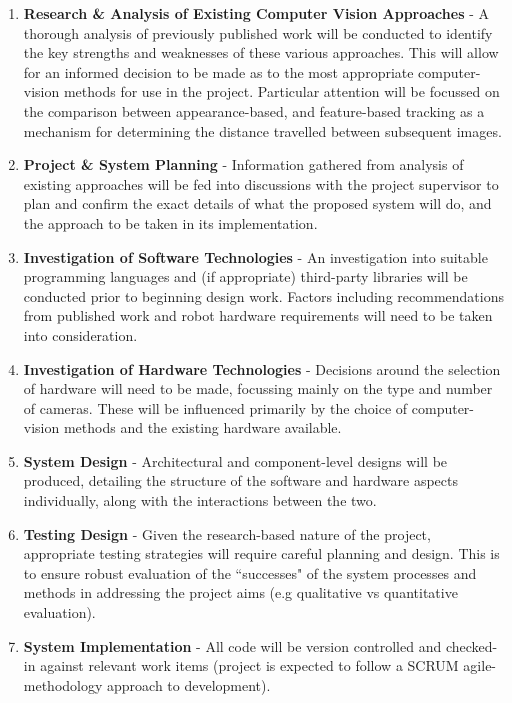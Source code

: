 \documentclass[10pt,fleqn,twoside]{article}
\begin{document}
\begin{enumerate}
	\item \textbf{Research \& Analysis of Existing Computer Vision Approaches} -  A thorough analysis of previously published work will be conducted to identify the key strengths and weaknesses of these various approaches. This will allow for an informed decision to be made as to the most appropriate computer-vision methods for use in the project. Particular attention will be focussed on the comparison between appearance-based, and feature-based tracking as a mechanism for determining the distance travelled between subsequent images. 
	
	\item \textbf{Project \& System Planning} - Information gathered from analysis of existing approaches will be fed into discussions with the project supervisor to plan and confirm the exact details of what the proposed system will do, and the approach to be taken in its implementation.

	\item \textbf{Investigation of Software Technologies} - An investigation into suitable programming languages and (if appropriate) third-party libraries will be conducted prior to beginning design work. Factors including recommendations from published work and robot hardware requirements will need to be taken into consideration.
	
	\item \textbf{Investigation of Hardware Technologies} - Decisions around the selection of hardware will need to be made, focussing mainly on the type and number of cameras. These will be influenced primarily by the choice of computer-vision methods and the existing hardware available.

	\item \textbf{System Design} - Architectural and component-level designs will be produced, detailing the structure of the software and hardware aspects individually, along with the interactions between the two.
	
	\item \textbf{Testing Design} - Given the research-based nature of the project, appropriate testing strategies will require careful planning and design. This is to ensure robust evaluation of the ``successes" of the system processes and methods in addressing the project aims (e.g qualitative vs quantitative evaluation).
	
	\item \textbf{System Implementation} - All code will be version controlled and checked-in against relevant work items (project is expected to follow a SCRUM agile-methodology approach to development). 
	

\end{enumerate}
\end{document}
